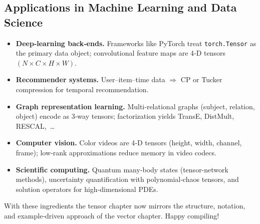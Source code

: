 \subsection{Applications in Machine Learning and Data Science}
\begin{itemize}
\item \textbf{Deep‑learning back‑ends.}
  Frameworks like PyTorch treat
  \verb|torch.Tensor| as the primary data object; convolutional
  feature maps are 4‑D tensors $(N\!\times\!C\!\times\!H\!\times\!W)$.
\item \textbf{Recommender systems.}
  User–item–time data $\Rightarrow$ CP or Tucker compression
  for temporal recommendation.
\item \textbf{Graph representation learning.}
  Multi‑relational graphs (subject, relation, object)
  encode as 3‑way tensors; factorization yields
  TransE, DistMult, RESCAL, …
\item \textbf{Computer vision.}
  Color videos are 4‑D tensors (height, width, channel, frame);
  low‑rank approximations reduce memory in video codecs.
\item \textbf{Scientific computing.}
  Quantum many‑body states (tensor‑network methods),
  uncertainty quantification with polynomial‑chaos tensors,
  and solution operators for high‑dimensional PDEs.
\end{itemize}

\bigskip
\noindent
With these ingredients the tensor chapter now mirrors the structure,
notation, and example‑driven approach of the vector chapter.  Happy compiling!